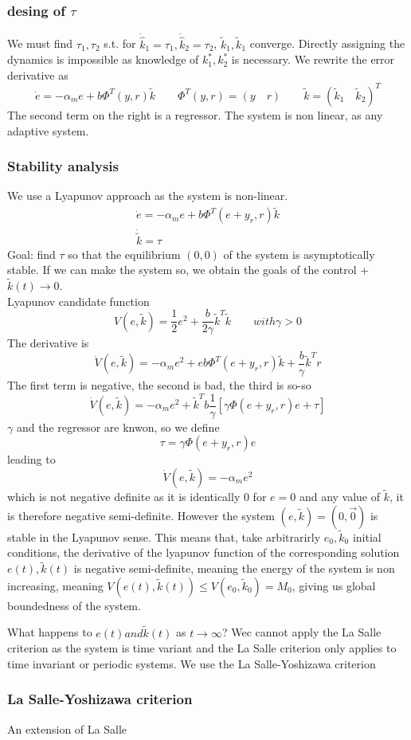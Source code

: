 \documentclass{book}
\begin{document}
\subsubsection{desing of $\tau$}
We must find $\tau_1,\tau_2$ s.t. for $\dot{\hat{k}}_1=\tau_1,\dot{\hat{k}}_2=\tau_2$, $\tilde{k}_1,\tilde{k}_1$ converge. Directly assigning the dynamics is impossible as knowledge of $k_1^*,k_2^*$ is necessary. We rewrite the error derivative as 
\[
    \dot{e}=-\alpha_me+b\Phi^T(y,r)\tilde{k} \qquad \Phi^T(y,r)=(y\quad r) \qquad \tilde{k}=(\tilde{k}_1 \quad \tilde{k}_2)^T
\]
The second term on the right is a regressor. The system is non linear, as any adaptive system. 
\subsubsection{Stability analysis}
We use a Lyapunov approach as the system is non-linear. 
\begin{gather*}
    \dot{e}=-\alpha_me+b\Phi^T(e+y_r,r)\tilde{k} \\
    \dot{\tilde{k}}=\tau
\end{gather*}
Goal: find $\tau$ so that the equilibrium $(0,0)$ of the system is asymptotically stable. If we can make the system so, we obtain the goals of the control + $\tilde{k}(t)\to 0$. 
\\Lyapunov candidate function
\[
    V(e,\tilde{k})=\displaystyle\frac{1}{2}e^2+\displaystyle\frac{b}{2\gamma}\tilde{k}^T\tilde{k} \qquad with \gamma>0
\]
The derivative is 
\[
    \dot{V}(e,\tilde{k})=-\alpha_me^2+eb\Phi^T(e+y_r,r)\tilde{k} + \displaystyle\frac{b}{\gamma}\tilde{k}^Tr
\]
The first term is negative, the second is bad, the third is so-so
\[
    \dot{V}(e,\tilde{k})=-\alpha_me^2+\tilde{k}^Tb\displaystyle\frac{1}{\gamma}[\gamma\Phi(e+y_r,r)e+\tau]
\]
$\gamma$ and the regressor are knwon, so we define 
\[
    \tau=\gamma\Phi(e+y_r,r)e
\]
leading to 
\[
    \dot{V}(e,\tilde{k})=-\alpha_me^2
\]
which is not negative definite as it is identically 0 for $e=0$ and any value of $\tilde{k}$, it is therefore negative semi-definite. However the system $(e,\tilde{k})=(0,\vec{0})$ is stable in the Lyapunov sense.
This means that, take arbitrarirly $e_0,\tilde{k}_0$ initial conditions, the derivative of the lyapunov function of the corresponding solution $e(t),\tilde{k}(t)$ is negative semi-definite, meaning the energy of the system is non increasing, meaning $V(e(t),\tilde{k}(t))\leq V(e_0,\tilde{k}_0)=M_0$, giving us global boundedness of the system. 

What happens to $e(t) and \tilde{k}(t)$ as $t\to\infty$? Wec cannot apply the La Salle criterion as the system is time variant and the La Salle criterion only applies to time invariant or periodic systems. We use the La Salle-Yoshizawa criterion 
\subsubsection{La Salle-Yoshizawa criterion}
An extension of La Salle
\end{document}
